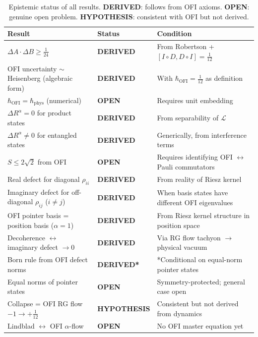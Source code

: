 \documentclass[12pt]{article}
\theoremstyle{definition}
\newcommand{\OFI}{\mathrm{OFI}}
\begin{document}
\begin{table}[ht]
\centering
\renewcommand{\arraystretch}{1.3}
\begin{tabular}{@{}lll@{}}
\toprule
\textbf{Result} & \textbf{Status} & \textbf{Condition} \\
\midrule
$\Delta A\cdot\Delta B \geq \tfrac{1}{24}$
  & \textcolor{derivedcolor}{\textbf{DERIVED}}
  & From Robertson + $[I\circ D, D\circ I] = \tfrac{1}{12}$ \\
OFI uncertainty $\sim$ Heisenberg (algebraic form)
  & \textcolor{derivedcolor}{\textbf{DERIVED}}
  & With $\hbar_{\OFI} = \tfrac{1}{12}$ as definition \\
$\hbar_{\OFI} = \hbar_{\mathrm{phys}}$ (numerical)
  & \textcolor{opencolor}{\textbf{OPEN}}
  & Requires unit embedding \\
\midrule
$\Delta R^\alpha = 0$ for product states
  & \textcolor{derivedcolor}{\textbf{DERIVED}}
  & From separability of $\mathcal{L}$ \\
$\Delta R^\alpha \neq 0$ for entangled states
  & \textcolor{derivedcolor}{\textbf{DERIVED}}
  & Generically, from interference terms \\
$S \leq 2\sqrt{2}$ from OFI
  & \textcolor{opencolor}{\textbf{OPEN}}
  & Requires identifying OFI $\leftrightarrow$ Pauli commutators \\
\midrule
Real defect for diagonal $\rho_{ii}$
  & \textcolor{derivedcolor}{\textbf{DERIVED}}
  & From reality of Riesz kernel \\
Imaginary defect for off-diagonal $\rho_{ij}$ ($i\neq j$)
  & \textcolor{derivedcolor}{\textbf{DERIVED}}
  & When basis states have different OFI eigenvalues \\
OFI pointer basis = position basis ($\alpha=1$)
  & \textcolor{derivedcolor}{\textbf{DERIVED}}
  & From Riesz kernel structure in position space \\
Decoherence $\leftrightarrow$ imaginary defect $\to 0$
  & \textcolor{derivedcolor}{\textbf{DERIVED}}
  & Via RG flow tachyon $\to$ physical vacuum \\
\midrule
Born rule from OFI defect norms
  & \textcolor{derivedcolor}{\textbf{DERIVED*}}
  & *Conditional on equal-norm pointer states \\
Equal norms of pointer states
  & \textcolor{opencolor}{\textbf{OPEN}}
  & Symmetry-protected; general case open \\
Collapse = OFI RG flow $-1\to +\tfrac{1}{12}$
  & \textcolor{inputcolor}{\textbf{HYPOTHESIS}}
  & Consistent but not derived from dynamics \\
Lindblad $\leftrightarrow$ OFI $\alpha$-flow
  & \textcolor{opencolor}{\textbf{OPEN}}
  & No OFI master equation yet \\
\bottomrule
\end{tabular}
\caption{Epistemic status of all results.  \textcolor{derivedcolor}{\textbf{DERIVED}}:
follows from OFI axioms.  \textcolor{opencolor}{\textbf{OPEN}}: genuine open problem.
\textcolor{inputcolor}{\textbf{HYPOTHESIS}}: consistent with OFI but not derived.}
\label{tab:summary}
\end{table}
\end{document}
